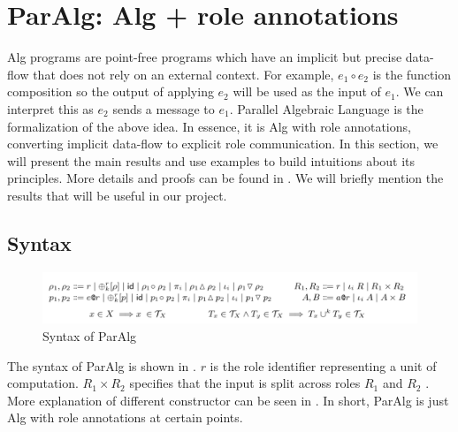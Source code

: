 \section{ParAlg: Alg + role annotations}
Alg programs are point-free programs which have an implicit but precise data-flow that does not rely on an external context. For example, $e_1 \circ e_2$ is the function composition so the output of applying $e_2$ will be used as the input of $e_1$. We can interpret this as $e_2$ sends a message to $e_1$. Parallel Algebraic Language is the formalization of the above idea. In essence, it is Alg with role annotations, converting implicit data-flow to explicit role communication. In this section, we will present the main results and use examples to build intuitions about its principles. More details and proofs can be found in \cite{castroAlgebraicMultipartyProtocol}. We will briefly mention the results that will be useful in our project.

\subsection{Syntax}
\begin{figure}[ht]
    \centering
    \includegraphics[width=\textwidth]{project/paralg.png}
    \caption{Syntax of ParAlg}
    \label{project:tab:paralg}
\end{figure}
The syntax of ParAlg is shown in . $r$ is the role identifier representing a unit of computation. $R_1 \times R_2$ specifies that the input is split across roles $R_1$ and $R_2$ \cite{castroAlgebraicMultipartyProtocol}. More explanation of different constructor can be seen in \cite{castroAlgebraicMultipartyProtocol}. In short, ParAlg is just Alg with role annotations at certain points. 

